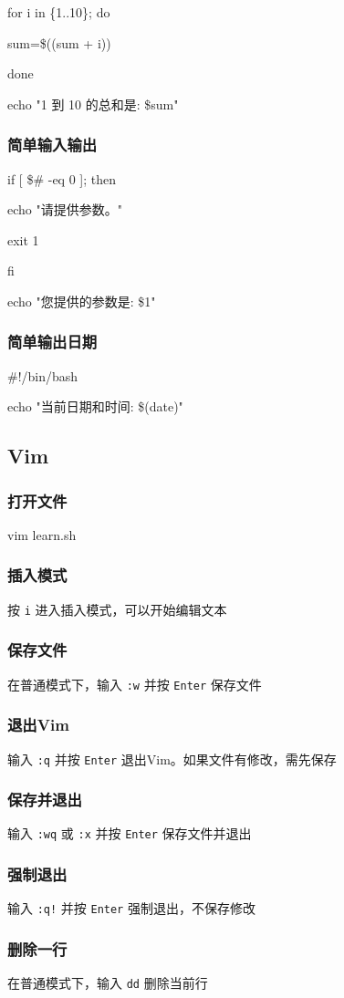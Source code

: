 \documentclass{ctexart}
\begin{document}
for i in \{1..10\}; do

sum=\$((sum + i))

done 

echo "1 到 10 的总和是: \$sum"  
\subsubsection{简单输入输出}
if [ \$# -eq 0 ]; then

echo "请提供参数。"

exit 1

fi 

echo "您提供的参数是: \$1"   
\subsubsection{简单输出日期}
\#!/bin/bash 

echo "当前日期和时间: \$(date)" 
\subsection{Vim}
\subsubsection{打开文件}
vim learn.sh 
\subsubsection{插入模式}
按 \verb|i| 进入插入模式，可以开始编辑文本 
\subsubsection{保存文件 }
在普通模式下，输入 \verb|:w| 并按 \verb|Enter| 保存文件
\subsubsection{退出Vim}
输入 \verb|:q| 并按 \verb|Enter| 退出Vim。如果文件有修改，需先保存
\subsubsection{保存并退出}
输入 \verb|:wq| 或 \verb|:x| 并按 \verb|Enter| 保存文件并退出 
\subsubsection{强制退出}
输入 \verb|:q!| 并按 \verb|Enter| 强制退出，不保存修改 
\subsubsection{删除一行}
在普通模式下，输入 \verb|dd| 删除当前行 
\end{document}
